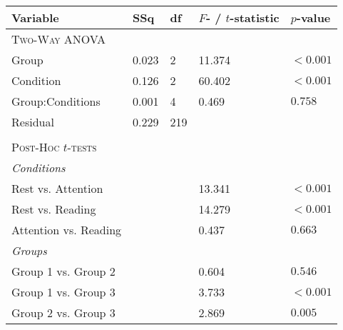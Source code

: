 \begin{tabular}{L{4cm}C{1.2cm}C{1.2cm}C{3cm}C{1.5cm}}
\toprule
Variable &    SSq &     df &          $F$- / $t$-statistic &        $p$-value \\
\midrule
\textsc{Two-Way ANOVA} 	& 	& & & \\
\hspace{3pt}Group                   &  0.023 &    2 &  11.374 &  $< 0.001$ \\
\hspace{3pt}Condition               &  0.126 &    2 &  60.402 &  $< 0.001$ \\
\hspace{3pt}Group:Conditions 		&  0.001 &    4 &   0.469 &  $0.758$ \\
\hspace{3pt}Residual                &  0.229 &  219 &         &            \\
& & & & \\
\textsc{Post-Hoc $t$-tests} & & & & \\
\textit{Conditions} & & & & \\
\hspace{3pt}Rest vs. Attention  	&    &     &  13.341 &  $< 0.001$ \\
\hspace{3pt}Rest vs. Reading  	&    &     &  14.279 &  $< 0.001$ \\
\hspace{3pt}Attention vs. Reading &    &    &  0.437 &  $0.663$ \\
\textit{Groups} & & & & \\
\hspace{3pt}Group 1 vs. Group 2  &    &     &  0.604 &  $0.546$ \\
\hspace{3pt}Group 1 vs. Group 3  &    &     &  3.733 &  $< 0.001$ \\
\hspace{3pt}Group 2 vs. Group 3  &    &     &  2.869 &  $0.005$ \\
\bottomrule
\end{tabular}

